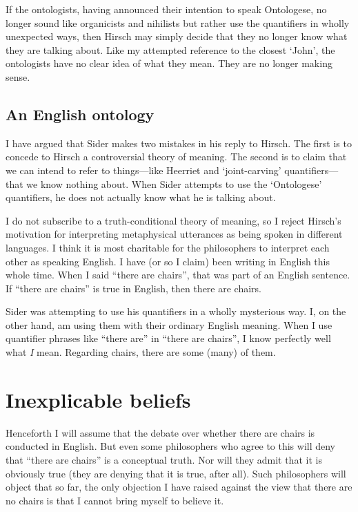 \documentclass[11pt]{article}
\begin{document}
\begin{spacing}{1.25}
If the ontologists, having announced their intention to speak
Ontologese, no longer sound like organicists and nihilists but rather
use the quantifiers in wholly unexpected ways, then Hirsch may simply
decide that they no longer know what they are talking about.  Like my
attempted reference to the closest `John', the ontologists have no
clear idea of what they mean.  They are no longer making sense.

\subsection{An English ontology}
I have argued that Sider makes two mistakes in his reply to Hirsch.
The first is to concede to Hirsch a controversial theory of meaning.
The second is to claim that we can intend to refer to things---like
Heerriet and `joint-carving' quantifiers---that we know nothing about.
 When Sider attempts to use the `Ontologese' quantifiers, he does not
 actually know what he is talking about.

I do not subscribe
to a truth-conditional theory of meaning, so I reject Hirsch's
motivation for interpreting metaphysical utterances as being spoken in
different languages.  I think it is most charitable for the
philosophers to interpret each other as speaking English.  I have (or
so I claim) been writing in English this whole time.  When I said
``there are chairs'', that was part of an English sentence.  If
``there are chairs'' is true in English, then there are chairs.

Sider was attempting to use his quantifiers in a wholly mysterious
way.  I, on the other hand, am using them with their ordinary English
meaning.  When I use quantifier phrases like ``there are'' in ``there
are chairs'', I know perfectly well what {\em I} mean.  Regarding
chairs, there are some (many) of them.


\section{Inexplicable beliefs}
Henceforth I will assume that the debate over whether there are chairs
is conducted in English.  But even some philosophers who agree to this
will deny that ``there are chairs'' is a conceptual truth.  Nor will
they admit that it is obviously true (they are denying that it is
true, after all).  Such philosophers will object that so far, the only
objection I have raised against the view that there are no chairs is
that I cannot bring myself to believe it.


\end{spacing}
\end{document}

